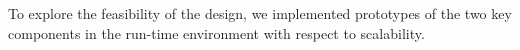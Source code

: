 To explore the feasibility of the \flux design, we implemented prototypes
of the two key components in the \flux run-time environment with respect to scalability.
%


